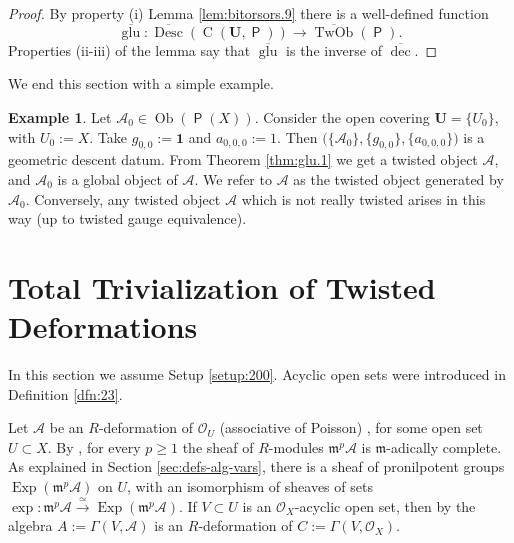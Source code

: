 \documentclass[a4paper, 10pt]{amsart}
\theoremstyle{definition}
\newtheorem{exa}[equation]{Example}
\numberwithin{equation}{section}
\newcommand{\iso}{\xrightarrow{\simeq}}
\newcommand{\opn}{\operatorname}
\newcommand{\cat}[1]{\operatorname{\mathsf{#1}}}
\newcommand{\ol}{\overline}
\newcommand{\mfrak}[1]{\mathfrak{#1}}
\newcommand{\mcal}[1]{\mathcal{#1}}
\newcommand{\bsym}[1]{\boldsymbol{#1}}
\newcommand{\m}{\mfrak{m}}
\newcommand{\gerbe}[1]{\bsym{\mcal{#1}}}
\newcommand{\twocat}[1]{\operatorname{\bsym{\cat{#1}}}}
\begin{document}
\begin{proof}
By property (i) Lemma \ref{lem:bitorsors.9} there is a
well-defined function 
\[ \ol{\opn{glu}} :  \ol{\opn{Desc}}(\opn{C}(\bsym{U}, \twocat{P})) \to 
\ol{\opn{TwOb}}(\twocat{P}) . \]
Properties (ii-iii) of the lemma say that $\ol{\opn{glu}}$ is the 
inverse of $\ol{\opn{dec}}$.
\end{proof}

We end this section with a simple example.

\begin{exa} \label{exa:19}
Let $\mcal{A}_0 \in \opn{Ob}(\twocat{P}(X))$. Consider the open covering
$\bsym{U} = \{ U_0 \}$, with $U_0 := X$. 
Take $g_{0,0} := \bsym{1}$ and $a_{0,0,0} := 1$.
Then 
$\bigl( \{ \mcal{A}_0 \}, \{ g_{0,0} \}, \{ a_{0,0,0} \} \bigr)$
is a geometric descent datum. {}From Theorem \ref{thm:glu.1} we get a twisted
object $\gerbe{A}$,
and  $\mcal{A}_0$ is a global object of $\gerbe{A}$. We refer to $\gerbe{A}$
as the twisted object generated by $\mcal{A}_0$.
Conversely, any twisted object $\gerbe{A}$ which is not really twisted
arises in this way (up to twisted gauge equivalence). 
\end{exa}





\section{Total Trivialization of Twisted Deformations}
\label{sec:tttf}

In this section we assume Setup \ref{setup:200}. 
Acyclic open sets were introduced in Definition \ref{dfn:23}.

Let $\mcal{A}$ be an $R$-deformation of $\mcal{O}_U$
(associative of Poisson) , for some open set 
$U \subset X$. By \cite[Corollary 3.8]{Ye9}, for every $p \geq 1$ 
the sheaf of $R$-modules $\m^p \mcal{A}$ is $\m$-adically complete.
As explained in Section \ref{sec:defs-alg-vars}, there is a sheaf of
pronilpotent groups $\opn{Exp}(\m^p \mcal{A})$ on $U$, with an isomorphism of
sheaves of sets 
$\exp : \m^p \mcal{A} \iso \opn{Exp}(\m^p \mcal{A})$.
If $V \subset U$ is an $\mcal{O}_X$-acyclic open set, then by 
\cite[Proposition 4.5]{Ye9} the algebra 
$A := \Gamma(V, \mcal{A})$ is an $R$-deformation of 
$C := \Gamma(V, \mcal{O}_X)$.
\end{document}
